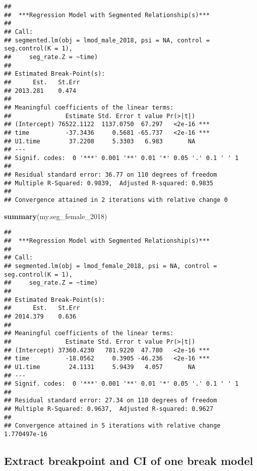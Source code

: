 \documentclass[]{article}
\newenvironment{Shaded}{\begin{snugshade}}{\end{snugshade}}
\newcommand{\KeywordTok}[1]{\textcolor[rgb]{0.13,0.29,0.53}{\textbf{#1}}}
\newcommand{\DecValTok}[1]{\textcolor[rgb]{0.00,0.00,0.81}{#1}}
\newcommand{\NormalTok}[1]{#1}
\begin{document}
\begin{verbatim}
## 
##  ***Regression Model with Segmented Relationship(s)***
## 
## Call: 
## segmented.lm(obj = lmod_male_2018, psi = NA, control = seg.control(K = 1), 
##     seg_rate.Z = ~time)
## 
## Estimated Break-Point(s):
##      Est.   St.Err 
## 2013.281    0.474 
## 
## Meaningful coefficients of the linear terms:
##               Estimate Std. Error t value Pr(>|t|)    
## (Intercept) 76522.1122  1137.0750  67.297   <2e-16 ***
## time          -37.3436     0.5681 -65.737   <2e-16 ***
## U1.time        37.2208     5.3303   6.983       NA    
## ---
## Signif. codes:  0 '***' 0.001 '**' 0.01 '*' 0.05 '.' 0.1 ' ' 1
## 
## Residual standard error: 36.77 on 110 degrees of freedom
## Multiple R-Squared: 0.9839,  Adjusted R-squared: 0.9835 
## 
## Convergence attained in 2 iterations with relative change 0
\end{verbatim}

\begin{Shaded}
\begin{Highlighting}[]
\KeywordTok{summary}\NormalTok{(my.seg_female_}\DecValTok{2018}\NormalTok{)}
\end{Highlighting}
\end{Shaded}

\begin{verbatim}
## 
##  ***Regression Model with Segmented Relationship(s)***
## 
## Call: 
## segmented.lm(obj = lmod_female_2018, psi = NA, control = seg.control(K = 1), 
##     seg_rate.Z = ~time)
## 
## Estimated Break-Point(s):
##      Est.   St.Err 
## 2014.379    0.636 
## 
## Meaningful coefficients of the linear terms:
##               Estimate Std. Error t value Pr(>|t|)    
## (Intercept) 37360.4230   781.9220  47.780   <2e-16 ***
## time          -18.0562     0.3905 -46.236   <2e-16 ***
## U1.time        24.1131     5.9439   4.057       NA    
## ---
## Signif. codes:  0 '***' 0.001 '**' 0.01 '*' 0.05 '.' 0.1 ' ' 1
## 
## Residual standard error: 27.34 on 110 degrees of freedom
## Multiple R-Squared: 0.9637,  Adjusted R-squared: 0.9627 
## 
## Convergence attained in 5 iterations with relative change 1.770497e-16
\end{verbatim}

\subsection{Extract breakpoint and CI of one break
model}\label{extract-breakpoint-and-ci-of-one-break-model}
\end{document}
